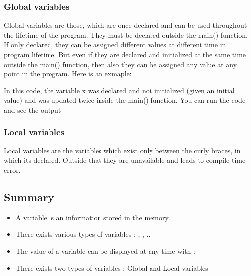 \documentclass[11pt, a4paper]{article}
\begin{document}
\subsubsection{Global variables}
Global variables are those, which are once declared and can be used throughout
the lifetime of the program. They must be declared
outside the main() function. If only declared, they can be assigned different
values at different time in program lifetime. But even if they are declared and
initialized at the same time outside the main() function, then also they can be
assigned any value at any point in the program. Here is an exmaple:

In this code, the variable x was declared and not initialized (given an initial value)
and was updated twice inside the main() function. You can run the code and see the output

\subsubsection{Local variables}
Local variables are the variables which exist only between the curly braces,
in which its declared. Outside that they are unavailable and leads to compile time error.

\subsection{Summary}
\begin{itemize}
\item A variable is an information stored in the memory.
\item There exists various types of variables : , ,  ...
\item The value of a variable can be displayed at any time with : 
\item There exists two types of variables : Global and Local variables
\end{itemize}
\end{document}
